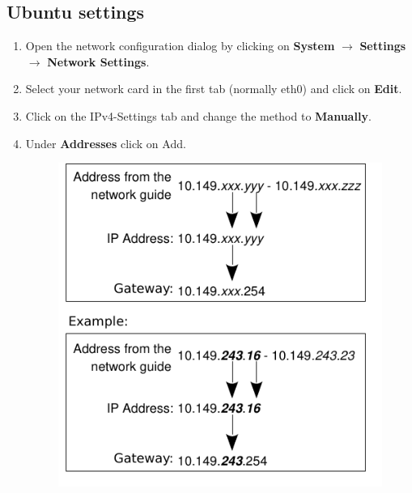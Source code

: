 \documentclass[a4paper,12pt]{scrartcl}
\newcommand{\optemph}[1]{\textbf{#1}}
\begin{document}
\subsection*{Ubuntu settings}
\begin{enumerate}
	\item Open the network configuration dialog by clicking on \optemph{System} $\rightarrow$ \optemph{Settings} $\rightarrow$ \optemph{Network Settings}.
	\item Select your network card in the first tab (normally eth0) and click on \optemph{Edit}.
	\item Click on the IPv4-Settings tab and change the method to \optemph{Manually}.
	\item Under \optemph{Addresses} click on Add.
      \begin{figure}[h!]
        \centering
        \begin{minipage}[c]{0.45\linewidth}
          \centering
          \includegraphics[width=\linewidth,keepaspectratio]{Bilder/IP_Gerneric_EN}
        \end{minipage}
        \begin{minipage}[c]{0.5\linewidth}
          \centering

\end{minipage}
\end{figure}
\end{enumerate}
\end{document}
